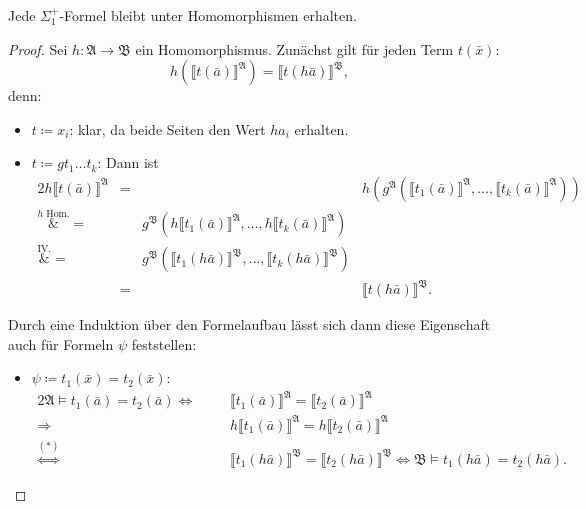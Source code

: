 \begin{lemma}
	Jede $\Sigma^+_1$-Formel bleibt unter Homomorphismen erhalten.
	\label{Sigma1UnterHom}
\end{lemma}
\begin{proof}
	Sei $h:\mathfrak{A}\to\mathfrak{B}$ ein Homomorphismus. Zunächst gilt für jeden Term $t(\bar{x})$:
	\[h(\llbracket t(\bar{a})\rrbracket^\mathfrak{A})=\llbracket t(h\bar{a})\rrbracket^\mathfrak{B}, \tag{$\ast$}\]
	denn:
	\begin{itemize}
		\item $t\coloneqq x_i$: klar, da beide Seiten den Wert $ha_i$ \glqq erhalten\grqq{}.
		\item $t\coloneqq gt_1\dots t_k$: Dann ist
		\begin{alignat*}{2}
			h\llbracket t(\bar{a})\rrbracket^\mathfrak{A} 
			&= &&h(g^\mathfrak{A}(\llbracket t_1(\bar{a})\rrbracket^\mathfrak{A},\dots,\llbracket t_k(\bar{a})\rrbracket^\mathfrak{A})) \\
			\overset{h \text{ Hom.}}&{=} &&g^\mathfrak{B}(h\llbracket t_1(\bar{a})\rrbracket^\mathfrak{A},\dots,h\llbracket t_k(\bar{a})\rrbracket^\mathfrak{A}) \\
			\overset{\text{IV.}}&{=} &&g^\mathfrak{B}(\llbracket t_1(h\bar{a})\rrbracket^\mathfrak{B},\dots,\llbracket t_k(h\bar{a})\rrbracket^\mathfrak{B}) \\
			&= &&\llbracket t(h\bar{a})\rrbracket^\mathfrak{B}.
		\end{alignat*}
	\end{itemize}
	Durch eine Induktion über den Formelaufbau lässt sich dann diese Eigenschaft auch für Formeln $\psi$ feststellen:
	\begin{itemize}
		\item $\psi\coloneqq t_1(\bar{x})=t_2(\bar{x})$:
		\begin{alignat*}{2}
			\mathfrak{A}\models t_1(\bar{a})=t_2(\bar{a})
			\Longleftrightarrow& &&\llbracket t_1(\bar{a})\rrbracket^\mathfrak{A} = \llbracket t_2(\bar{a})\rrbracket^\mathfrak{A} \\
			\Longrightarrow& &&h\llbracket t_1(\bar{a})\rrbracket^\mathfrak{A} = h\llbracket t_2(\bar{a})\rrbracket^\mathfrak{A} \tag{$\vartriangle$}\\
			\overset{(\ast)}{\Longleftrightarrow}& &&\llbracket t_1(h\bar{a})\rrbracket^\mathfrak{B} = \llbracket t_2(h\bar{a})\rrbracket^\mathfrak{B} \Leftrightarrow \mathfrak{B}\models t_1(h\bar{a})=t_2(h\bar{a}).
		\end{alignat*}
		

\end{itemize}
\end{proof}
